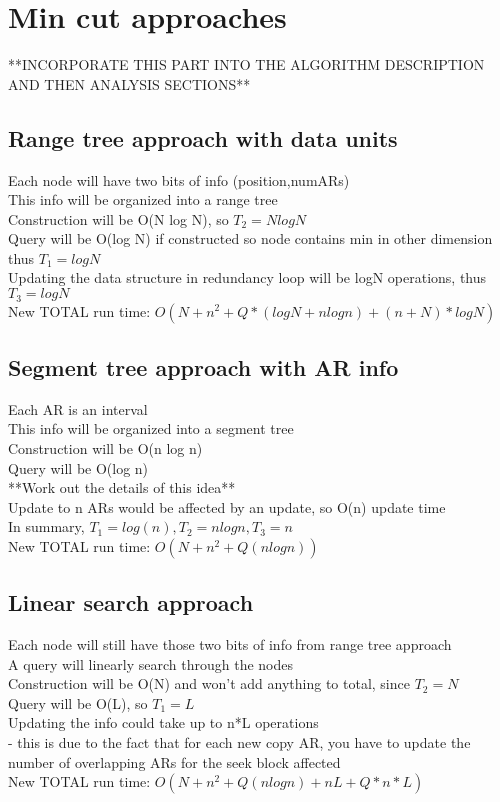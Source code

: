 \documentclass[11pt,psfig]{article}
\begin{document}
\section*{Min cut approaches}

**INCORPORATE THIS PART INTO THE ALGORITHM DESCRIPTION AND THEN ANALYSIS SECTIONS**

\subsection*{Range tree approach with data units}
Each node will have two bits of info (position,numARs)\\
This info will be organized into a range tree\\
Construction will be O(N log N), so $T_2=N logN$\\
Query will be O(log N) if constructed so node contains min in other dimension\\
 thus $T_1=logN$\\
Updating the data structure in redundancy loop will be logN operations, thus\\
 $T_3 = logN$\\
New TOTAL run time: $O(N + n^2 + Q*(logN + n log n) + (n+N)*logN)$

\subsection*{Segment tree approach with AR info}
		Each AR is an interval\\
		This info will be organized into a segment tree\\
		Construction will be O(n log n)\\
		Query will be O(log n)\\
			**Work out the details of this idea**\\
		Update to n ARs would be affected by an update, so O(n) update time\\
		In summary, $T_1=log(n), T_2=n logn, T_3 = n$\\
		New TOTAL run time: $O(N + n^2 + Q(n log n))$\\
\subsection*{Linear search approach}
		Each node will still have those two bits of info from range tree approach\\
		A query will linearly search through the nodes\\
		Construction will be O(N) and won't add anything to total, since $T_2 = N$\\
		Query will be O(L), so $T_1 = L$\\
		Updating the info could take up to n*L operations\\
			- this is due to the fact that for each new copy AR, you have to update 
				the number of overlapping ARs for the seek block affected\\
		New TOTAL run time: $O(N + n^2 + Q(n logn) + nL + Q*n*L)$
\end{document}
